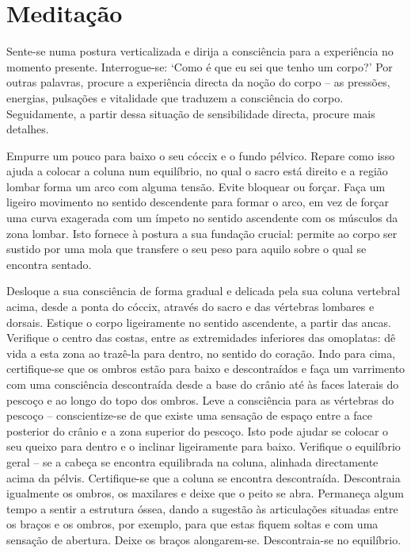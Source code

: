 
\chapter{Meditação}


Sente-se numa postura verticalizada e dirija a consciência para a experiência no
momento presente. Interrogue-se: `Como é que eu sei que tenho um corpo?' Por
outras palavras, procure a experiência directa da noção do corpo -- as pressões,
energias, pulsações e vitalidade que traduzem a consciência do corpo.
Seguidamente, a partir dessa situação de sensibilidade directa, procure mais
detalhes.

Empurre um pouco para baixo o seu cóccix e o fundo pélvico. Repare como isso
ajuda a colocar a coluna num equilíbrio, no qual o sacro está direito e a região
lombar forma um arco com alguma tensão. Evite bloquear ou forçar. Faça um
ligeiro movimento no sentido descendente para formar o arco, em vez de forçar
uma curva exagerada com um ímpeto no sentido ascendente com os músculos da zona
lombar. Isto fornece à postura a sua fundação crucial: permite ao corpo ser
sustido por uma mola que transfere o seu peso para aquilo sobre o qual se
encontra sentado.

Desloque a sua consciência de forma gradual e delicada pela sua coluna vertebral
acima, desde a ponta do cóccix, através do sacro e das vértebras lombares e
dorsais. Estique o corpo ligeiramente no sentido ascendente, a partir das ancas.
Verifique o centro das costas, entre as extremidades inferiores das omoplatas:
dê vida a esta zona ao trazê-la para dentro, no sentido do coração. Indo para
cima, certifique-se que os ombros estão para baixo e descontraídos e faça um
varrimento com uma consciência descontraída desde a base do crânio até às faces
laterais do pescoço e ao longo do topo dos ombros. Leve a consciência para as
vértebras do pescoço -- conscientize-se de que existe uma sensação de espaço
entre a face posterior do crânio e a zona superior do pescoço. Isto pode ajudar
se colocar o seu queixo para dentro e o inclinar ligeiramente para baixo.
Verifique o equilíbrio geral -- se a cabeça se encontra equilibrada na coluna,
alinhada directamente acima da pélvis. Certifique-se que a coluna se encontra
descontraída. Descontraia igualmente os ombros, os maxilares e deixe que o peito
se abra. Permaneça algum tempo a sentir a estrutura óssea, dando a sugestão às
articulações situadas entre os braços e os ombros, por exemplo, para que estas
fiquem soltas e com uma sensação de abertura. Deixe os braços alongarem-se.
Descontraia-se no equilíbrio.

